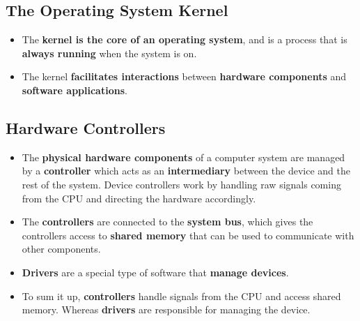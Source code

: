 \documentclass[16pt]{article}
\begin{document}
    \subsection*{The Operating System Kernel}
    \begin{itemize}
        \item The \textbf{kernel is the core of an operating system}, and is a process that is \textbf{always running} when the system is on.
        \item The kernel \textbf{facilitates interactions} between \textbf{hardware components} and \textbf{software applications}.
    \end{itemize}

    \subsection*{Hardware Controllers}
    \begin{itemize}
        \item The \textbf{physical hardware components} of a computer system are managed by a \textbf{controller} which acts as an \textbf{intermediary} between the device and the rest of the system. Device controllers work by handling raw signals coming from the CPU and directing the hardware accordingly.
        \item The \textbf{controllers} are connected to the \textbf{system bus}, which gives the controllers access to \textbf{shared memory} that can be used to communicate with other components.
        \item \textbf{Drivers} are a special type of software that \textbf{manage devices}.
        \item To sum it up, \textbf{controllers} handle signals from the CPU and access shared memory. Whereas \textbf{drivers} are responsible for managing the device.
    \end{itemize}
\end{document}
